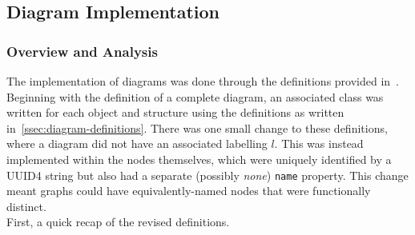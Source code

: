 \subsection{Diagram Implementation}

    \subsubsection{Overview and Analysis}
        The implementation of diagrams was done through the definitions provided in~\cite{solo-diagrams}.
        Beginning with the definition of a complete diagram, an associated class was written for each object and structure using the definitions as written in~\ref{ssec:diagram-definitions}.
        There was one small change to these definitions, where a diagram did not have an associated labelling $l$.
        This was instead implemented within the nodes themselves, which were uniquely identified by a UUID4 string but also had a separate (possibly \textit{none}) \texttt{name} property.
        This change meant graphs could have equivalently-named nodes that were functionally distinct. \\

        First, a quick recap of the revised definitions.

